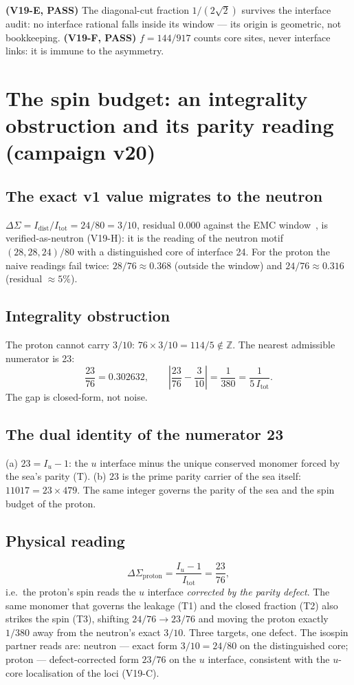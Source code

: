 \documentclass[11pt,a4paper]{article}
\begin{document}
\textbf{(V19-E, PASS)} The diagonal-cut fraction $1/(2\sqrt{2})$ survives the interface audit: no interface rational falls inside its window --- its origin is geometric, not bookkeeping. \textbf{(V19-F, PASS)} $f = 144/917$ counts core sites, never interface links: it is immune to the asymmetry.

\section{The spin budget: an integrality obstruction and its parity reading (campaign v20)}
\subsection{The exact v1 value migrates to the neutron}
$\Delta\Sigma = I_{\mathrm{dist}}/I_{\mathrm{tot}} = 24/80 = 3/10$, residual 0.000 against the EMC window~\cite{emc}, is verified-as-neutron (V19-H): it is the reading of the neutron motif $(28,28,24)/80$ with a distinguished core of interface 24. For the proton the naive readings fail twice: $28/76 \approx 0.368$ (outside the window) and $24/76 \approx 0.316$ (residual $\approx 5\%$).

\subsection{Integrality obstruction}
The proton cannot carry $3/10$: $76 \times 3/10 = 114/5 \notin \mathbb{Z}$. The nearest admissible numerator is 23:
\[\frac{23}{76} = 0.302632, \qquad \left|\frac{23}{76} - \frac{3}{10}\right| = \frac{1}{380} = \frac{1}{5\, I_{\mathrm{tot}}}.\]
The gap is closed-form, not noise.

\subsection{The dual identity of the numerator 23}
(a) $23 = I_u - 1$: the $u$ interface minus the unique conserved monomer forced by the sea's parity (T). (b) $23$ is the prime parity carrier of the sea itself: $11017 = 23 \times 479$. The same integer governs the parity of the sea and the spin budget of the proton.

\subsection{Physical reading}
\[\Delta\Sigma_{\mathrm{proton}} = \frac{I_u - 1}{I_{\mathrm{tot}}} = \frac{23}{76},\]
i.e.\ the proton's spin reads the $u$ interface \emph{corrected by the parity defect}. The same monomer that governs the leakage (T1) and the closed fraction (T2) also strikes the spin (T3), shifting $24/76 \to 23/76$ and moving the proton exactly $1/380$ away from the neutron's exact $3/10$. Three targets, one defect. The isospin partner reads are: neutron --- exact form $3/10 = 24/80$ on the distinguished core; proton --- defect-corrected form $23/76$ on the $u$ interface, consistent with the $u$-core localisation of the loci (V19-C).
\end{document}
